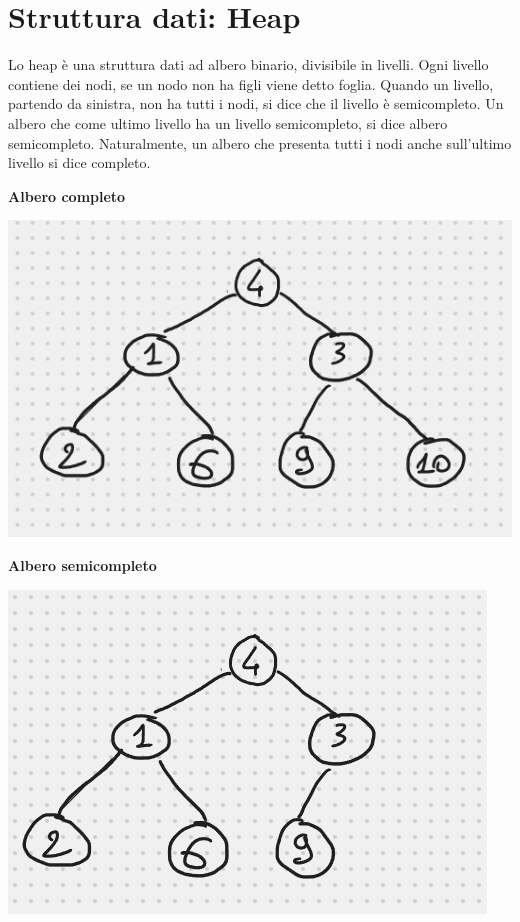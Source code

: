 \documentclass[a4paper,12pt,twoside]{report}
\begin{document}
\section{Struttura dati: Heap}
Lo heap \`{e} una struttura dati ad albero binario, divisibile in livelli. Ogni livello contiene dei nodi, se un nodo non ha figli viene detto foglia. Quando un livello, partendo da sinistra, non ha tutti i nodi, si dice che il livello \`{e} semicompleto. Un albero che come ultimo livello ha un livello semicompleto, si dice albero semicompleto. Naturalmente, un albero che presenta tutti i nodi anche sull'ultimo livello si dice completo.
\begin{multicols}{2}
\textbf{Albero completo}

\includegraphics[scale=0.3]{alberocompleto}

\textbf{Albero semicompleto}

\includegraphics[scale=0.3]{alberosemicompleto}
\end{multicols}
\end{document}
